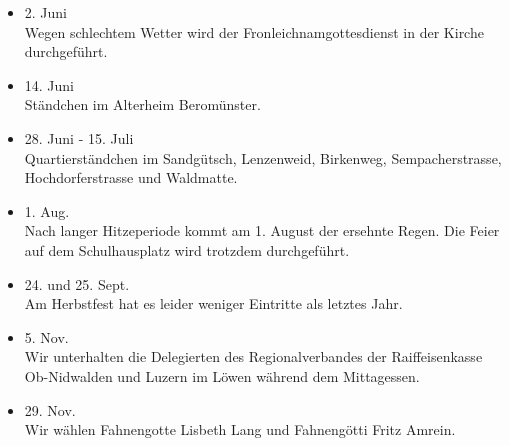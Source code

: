 \begin{history}
\begin{itemize}
        \item 2. Juni\\
              Wegen schlechtem Wetter wird der Fronleichnamgottesdienst in der Kirche
              durchgeführt.

        \item 14. Juni\\
              Ständchen im Alterheim Beromünster.

        \item 28. Juni - 15. Juli\\
              Quartierständchen im Sandgütsch, Lenzenweid, Birkenweg,
              Sempacherstrasse, Hochdorferstrasse und Waldmatte.

        \item 1. Aug.\\
              Nach langer Hitzeperiode kommt am 1. August der ersehnte Regen. Die
              Feier auf dem Schulhausplatz wird trotzdem durchgeführt.

        \item 24. und 25. Sept.\\
              Am Herbstfest hat es leider weniger Eintritte als letztes Jahr.

        \item 5. Nov.\\
              Wir unterhalten die Delegierten des Regionalverbandes der
              Raiffeisenkasse Ob-Nidwalden und Luzern im Löwen während dem
              Mittagessen.

        \item 29. Nov.\\
              Wir wählen Fahnengotte Lisbeth Lang und Fahnengötti Fritz Amrein.

    \end{itemize}

\end{history}
